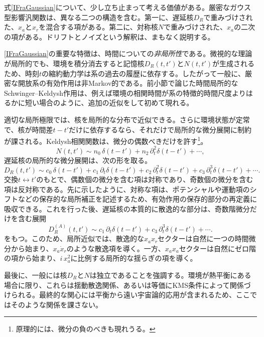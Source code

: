 \documentclass[a4paper,11pt,oneside]{article}
\theoremstyle{definition}
\numberwithin{equation}{section}
\begin{document}
式\eqref{IFraGaussian}について、少し立ち止まって考える価値がある。厳密なガウス型影響汎関数は、異なる二つの構造を含む。第一に、遅延核\(D_R\)で重みづけされた、\(x_a\)と\(x_r\)を混合する項がある。第二に、対称核\(N\)で重みづけされた、\(x_a\)の二次の項がある。ドリフトとノイズという解釈は、まもなく説明する。



\eqref{IFraGaussian}の重要な特徴は、時間についての\textit{非局所性}である。微視的な理論が局所的でも、環境を積分消去すると記憶核\(D_R(t,t')\)と\(N(t,t')\)が生成されるため、時刻\(t\)の縮約動力学は系の過去の履歴に依存する。したがって一般に、厳密な開放系の有効作用は非Markov的である。前小節で論じた時間局所的なSchwinger--Keldysh作用は、例えば環境の相関時間が系の特徴的時間尺度よりはるかに短い場合のように、追加の近似をして初めて現れる。



適切な局所極限では、核を局所的な分布で近似できる。さらに環境状態が定常で、核が時間差\(t-t'\)だけに依存するなら、それだけで局所的な微分展開に制約が課される。Keldysh相関関数は、微分の偶数べきだけを許す\footnote{原理的には、微分の負のべきも現れうる。}。
\begin{equation}
N(t,t')
\sim
n_0\,\delta(t-t')
+n_2\,\partial_t^2\delta(t-t')
+\cdots ,
\end{equation}
遅延核の局所的な微分展開は、次の形を取る。
\begin{equation}
D_R(t,t')
\sim
c_0\,\delta(t-t')
+c_1\,\partial_t\delta(t-t')
+c_2\,\partial_t^2\delta(t-t')
+c_3\,\partial_t^3\delta(t-t')
+\cdots .
\end{equation}
交換\(t\leftrightarrow t'\)のもとで、偶数個の微分を含む項は対称であり、奇数個の微分を含む項は反対称である。先に示したように、対称な項は、ポテンシャルや運動項のシフトなどの保存的な局所補正を記述するため、有効作用の保存的部分の再定義に吸収できる。これを行った後、遅延核の本質的に散逸的な部分は、奇数階微分だけを含む展開
\begin{equation}
D_R^{(A)}(t,t')
\sim
c_1\,\partial_t\delta(t-t')
+c_3\,\partial_t^3\delta(t-t')
+\cdots .
\end{equation}
をもつ。このため、局所近似では、散逸的な\(x_a x_r\)セクターは自然に一つの時間微分から始まり、\(x_a\dot x_r\)のような散逸項を導く。一方、\(x_a x_a\)セクターは自然にゼロ階の項から始まり、\(i\,x_a^2\)に比例する局所的な揺らぎの項を導く。



最後に、一般には核\(D_R\)と\(N\)は独立であることを強調する。環境が熱平衡にある場合に限り、これらは揺動散逸関係、あるいは等価にKMS条件によって関係づけられる。最終的な関心には平衡から遠い宇宙論的応用が含まれるため、ここではそのような関係を課さない。
\end{document}
